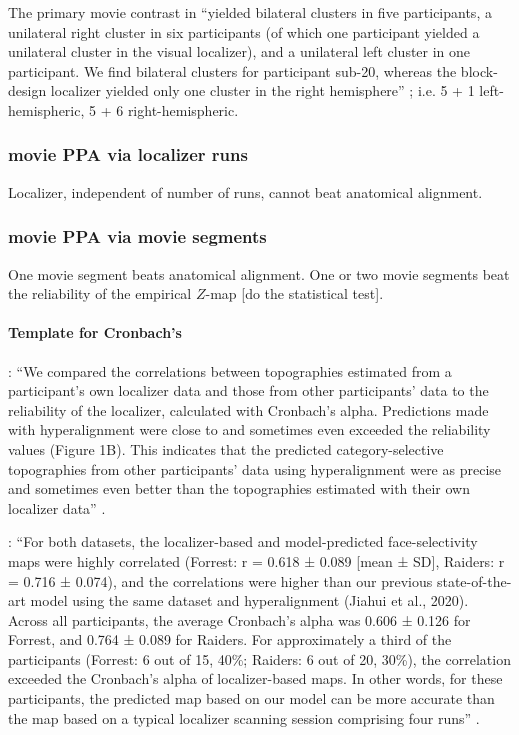 %
The primary movie contrast in \citet{haeusler2022processing} ``yielded bilateral
clusters in five participants, a unilateral right cluster in six participants
(of which one participant yielded a unilateral cluster in the visual localizer),
and a unilateral left cluster in one participant. We find bilateral clusters for
participant sub-20, whereas the block-design localizer yielded only one cluster
in the right hemisphere'' \citep{haeusler2022processing};
%
i.e. 5 + 1  left-hemispheric, 5 + 6 right-hemispheric.


\subsubsection{movie PPA via localizer runs}

Localizer, independent of number of runs, cannot beat anatomical alignment.


\subsubsection{movie PPA via movie segments}

One movie segment beats anatomical alignment.
%
One or two movie segments beat the reliability of the empirical $Z$-map [do the
statistical test].


\paragraph{Template for Cronbach's}

%
\citep{jiahui2022cross}: ``We compared the correlations between topographies
estimated from a participant's own localizer data and those from other
participants' data to the reliability of the localizer, calculated with
Cronbach's alpha.
%
Predictions made with hyperalignment were close to and sometimes even exceeded
the reliability values (Figure 1B).
%
This indicates that the predicted category-selective topographies from other
participants' data using hyperalignment were as precise and sometimes even
better than the topographies estimated with their own localizer data''
\citep{jiahui2022cross}.

%
\citep{feilong2022individualized}: ``For both datasets, the localizer-based and
model-predicted face-selectivity maps were highly correlated (Forrest: r = 0.618
± 0.089 [mean ± SD], Raiders: r = 0.716 ± 0.074), and the correlations were
higher than our previous state-of-the-art model using the same dataset and
hyperalignment (Jiahui et al., 2020).
%
Across all participants, the average Cronbach's alpha was 0.606 ± 0.126 for
Forrest, and 0.764 ± 0.089 for Raiders.
%
For approximately a third of the participants (Forrest: 6 out of 15, 40\%;
Raiders: 6 out of 20, 30\%), the correlation exceeded the Cronbach's alpha of
localizer-based maps.
%
In other words, for these participants, the predicted map based on our model can
be more accurate than the map based on a typical localizer scanning session
comprising four runs'' \citep{feilong2022individualized}.

